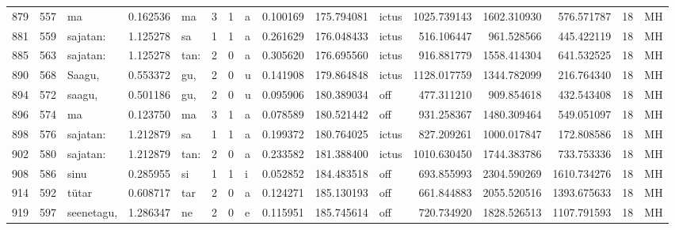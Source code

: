 \begin{tabular}{lrlrllllrrlrrrll}
879  &         557 &               ma &  0.162536 &      ma &        3 &      1 &       a &      0.100169 &    175.794081 &  ictus &  1025.739143 &  1602.310930 &   576.571787 &     18 &        MH \\
881  &         559 &         sajatan: &  1.125278 &      sa &        1 &      1 &       a &      0.261629 &    176.048433 &  ictus &   516.106447 &   961.528566 &   445.422119 &     18 &        MH \\
885  &         563 &         sajatan: &  1.125278 &    tan: &        2 &      0 &       a &      0.305620 &    176.695560 &  ictus &   916.881779 &  1558.414304 &   641.532525 &     18 &        MH \\
890  &         568 &           Saagu, &  0.553372 &     gu, &        2 &      0 &       u &      0.141908 &    179.864848 &  ictus &  1128.017759 &  1344.782099 &   216.764340 &     18 &        MH \\
894  &         572 &           saagu, &  0.501186 &     gu, &        2 &      0 &       u &      0.095906 &    180.389034 &    off &   477.311210 &   909.854618 &   432.543408 &     18 &        MH \\
896  &         574 &               ma &  0.123750 &      ma &        3 &      1 &       a &      0.078589 &    180.521442 &    off &   931.258367 &  1480.309464 &   549.051097 &     18 &        MH \\
898  &         576 &         sajatan: &  1.212879 &      sa &        1 &      1 &       a &      0.199372 &    180.764025 &  ictus &   827.209261 &  1000.017847 &   172.808586 &     18 &        MH \\
902  &         580 &         sajatan: &  1.212879 &    tan: &        2 &      0 &       a &      0.233582 &    181.388400 &  ictus &  1010.630450 &  1744.383786 &   733.753336 &     18 &        MH \\
908  &         586 &             sinu &  0.285955 &      si &        1 &      1 &       i &      0.052852 &    184.483518 &    off &   693.855993 &  2304.590269 &  1610.734276 &     18 &        MH \\
914  &         592 &            tütar &  0.608717 &     tar &        2 &      0 &       a &      0.124271 &    185.130193 &    off &   661.844883 &  2055.520516 &  1393.675633 &     18 &        MH \\
919  &         597 &       seenetagu, &  1.286347 &      ne &        2 &      0 &       e &      0.115951 &    185.745614 &    off &   720.734920 &  1828.526513 &  1107.791593 &     18 &        MH \\

\end{tabular}
